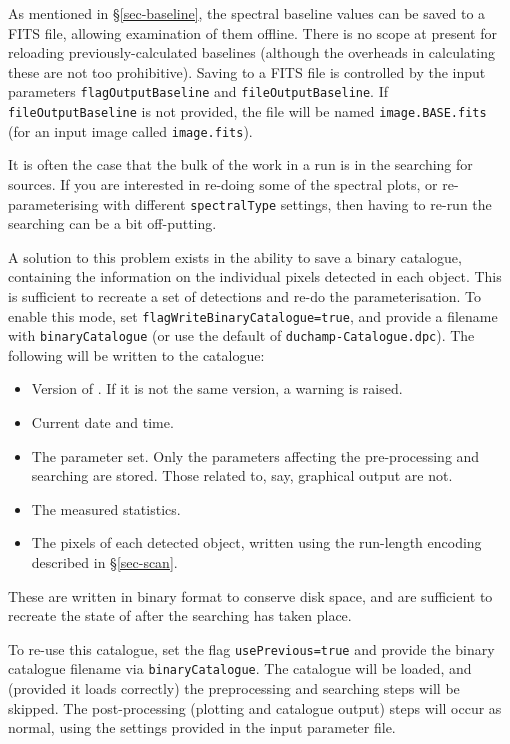 \label{sec-baselineOut}

As mentioned in \S\ref{sec-baseline}, the spectral baseline values can
be saved to a FITS file, allowing examination of them offline. There
is no scope at present for reloading previously-calculated baselines
(although the overheads in calculating these are not too
prohibitive). Saving to a FITS file is controlled by the input
parameters \texttt{flagOutputBaseline} and
\texttt{fileOutputBaseline}. If \texttt{fileOutputBaseline} is not
provided, the file will be named \texttt{image.BASE.fits} (for an
input image called \texttt{image.fits}).



\label{sec-reuse}



It is often the case that the bulk of the work in a \duchamp run is in
the searching for sources. If you are interested in re-doing some of
the spectral plots, or re-parameterising with different
\texttt{spectralType} settings, then having to re-run the searching
can be a bit off-putting. 

A solution to this problem exists in the ability to save a binary
catalogue, containing the information on the individual pixels
detected in each object. This is sufficient to recreate a set of
detections and re-do the parameterisation. To enable this mode, set
\texttt{flagWriteBinaryCatalogue=true}, and provide a filename with
\texttt{binaryCatalogue} (or use the default of
\texttt{duchamp-Catalogue.dpc}). The following will be written to the
catalogue: 
\begin{itemize}
\item Version of \duchamp. If it is not the same version, a warning is raised.
\item Current date and time.
\item The parameter set. Only the parameters affecting the
  pre-processing and searching are stored. Those related to, say,
  graphical output are not.
\item The measured statistics.
\item The pixels of each detected object, written using the run-length
  encoding described in \S\ref{sec-scan}.
\end{itemize}
These are written in binary format to conserve disk space, and are
sufficient to recreate the state of \duchamp after the searching has
taken place. 

To re-use this catalogue, set the flag \texttt{usePrevious=true} and
provide the binary catalogue filename via
\texttt{binaryCatalogue}. The catalogue will be loaded, and (provided
it loads correctly) the preprocessing and searching steps will be
skipped. The post-processing (\ie plotting and catalogue output) steps
will occur as normal, using the settings provided in the input
parameter file.


